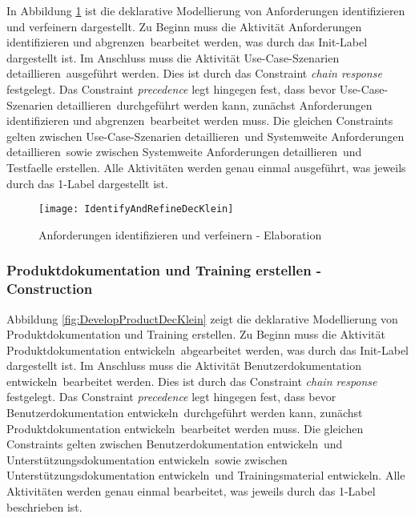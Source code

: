In Abbildung \ref{fig:IdentifyAndRefineDecKlein} ist die deklarative Modellierung von Anforderungen identifizieren und verfeinern dargestellt.
Zu Beginn muss die Aktivität \grqq Anforderungen identifizieren und abgrenzen\grqq \ bearbeitet werden, was durch das Init-Label dargestellt ist. Im Anschluss muss die Aktivität \grqq Use-Case-Szenarien detaillieren\grqq \ ausgeführt werden. Dies ist durch das Constraint \textit{chain response} festgelegt. Das Constraint \textit{precedence} legt hingegen fest, dass bevor \grqq Use-Case-Szenarien detaillieren\grqq \ durchgeführt werden kann, zunächst \grqq Anforderungen identifizieren und abgrenzen\grqq \ bearbeitet werden muss. Die gleichen Constraints gelten zwischen \grqq Use-Case-Szenarien detaillieren\grqq \ und \grqq Systemweite Anforderungen detaillieren\grqq \ sowie zwischen \grqq Systemweite Anforderungen detaillieren\grqq \ und \grqq Testfaelle erstellen\grqq. Alle Aktivitäten werden genau einmal ausgeführt, was jeweils durch das 1-Label dargestellt ist. 

\begin{figure}[h]
\begin{center}
  \texttt{[image: IdentifyAndRefineDecKlein]} %
  \caption{Anforderungen identifizieren und verfeinern - Elaboration}
  \label{fig:IdentifyAndRefineDecKlein}
\end{center}
\end{figure}

 \subsubsection{ Produktdokumentation und Training erstellen - Construction}

Abbildung \ref{fig:DevelopProductDecKlein} zeigt die deklarative Modellierung von \grqq Produktdokumentation und Training erstellen\grqq.
Zu Beginn muss die Aktivität \grqq Produktdokumentation entwickeln\grqq \ abgearbeitet werden, was durch das Init-Label dargestellt ist. Im Anschluss muss die Aktivität \grqq Benutzerdokumentation entwickeln\grqq \ bearbeitet werden. Dies ist durch das Constraint \textit{chain response} festgelegt. Das Constraint \textit{precedence} legt hingegen fest, dass bevor \grqq Benutzerdokumentation entwickeln\grqq \ durchgeführt werden kann, zunächst \grqq Produktdokumentation entwickeln\grqq \ bearbeitet werden muss. Die gleichen Constraints gelten zwischen \grqq Benutzerdokumentation entwickeln\grqq \ und \grqq Unterstützungsdokumentation entwickeln\grqq \ sowie zwischen \grqq Unterstützungsdokumentation entwickeln\grqq \ und \grqq Trainingsmaterial entwickeln\grqq. Alle Aktivitäten werden genau einmal bearbeitet, was jeweils durch das 1-Label beschrieben ist. 

